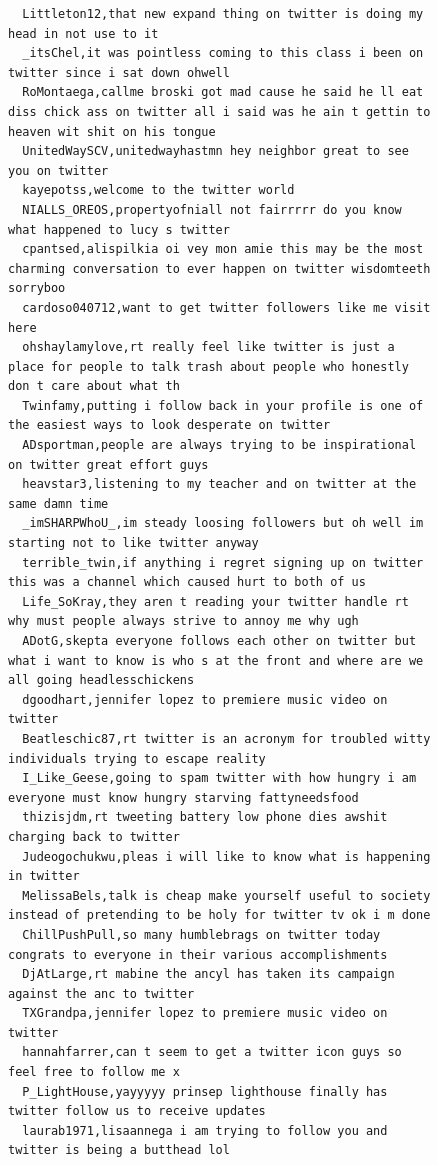 \begin{figure}[htpb]
\begin{verbatim}
  Littleton12,that new expand thing on twitter is doing my head in not use to it
  _itsChel,it was pointless coming to this class i been on twitter since i sat down ohwell
  RoMontaega,callme broski got mad cause he said he ll eat diss chick ass on twitter all i said was he ain t gettin to heaven wit shit on his tongue
  UnitedWaySCV,unitedwayhastmn hey neighbor great to see you on twitter
  kayepotss,welcome to the twitter world
  NIALLS_OREOS,propertyofniall not fairrrrr do you know what happened to lucy s twitter
  cpantsed,alispilkia oi vey mon amie this may be the most charming conversation to ever happen on twitter wisdomteeth sorryboo
  cardoso040712,want to get twitter followers like me visit here
  ohshaylamylove,rt really feel like twitter is just a place for people to talk trash about people who honestly don t care about what th
  Twinfamy,putting i follow back in your profile is one of the easiest ways to look desperate on twitter
  ADsportman,people are always trying to be inspirational on twitter great effort guys
  heavstar3,listening to my teacher and on twitter at the same damn time
  _imSHARPWhoU_,im steady loosing followers but oh well im starting not to like twitter anyway
  terrible_twin,if anything i regret signing up on twitter this was a channel which caused hurt to both of us
  Life_SoKray,they aren t reading your twitter handle rt why must people always strive to annoy me why ugh
  ADotG,skepta everyone follows each other on twitter but what i want to know is who s at the front and where are we all going headlesschickens
  dgoodhart,jennifer lopez to premiere music video on twitter
  Beatleschic87,rt twitter is an acronym for troubled witty individuals trying to escape reality
  I_Like_Geese,going to spam twitter with how hungry i am everyone must know hungry starving fattyneedsfood
  thizisjdm,rt tweeting battery low phone dies awshit charging back to twitter
  Judeogochukwu,pleas i will like to know what is happening in twitter
  MelissaBels,talk is cheap make yourself useful to society instead of pretending to be holy for twitter tv ok i m done
  ChillPushPull,so many humblebrags on twitter today congrats to everyone in their various accomplishments
  DjAtLarge,rt mabine the ancyl has taken its campaign against the anc to twitter
  TXGrandpa,jennifer lopez to premiere music video on twitter
  hannahfarrer,can t seem to get a twitter icon guys so feel free to follow me x
  P_LightHouse,yayyyyy prinsep lighthouse finally has twitter follow us to receive updates
  laurab1971,lisaannega i am trying to follow you and twitter is being a butthead lol

\end{verbatim}
\end{figure}
